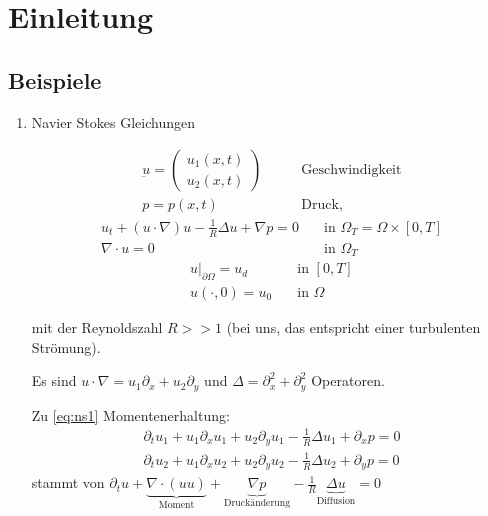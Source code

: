 
\section{Einleitung}
\label{sec:einleitung}

\subsection{Beispiele}
\label{sec:beispiele}

\begin{enumerate}
\item Navier Stokes Gleichungen

  \begin{align*}
    \underbar u =
    \begin{pmatrix}
      u_{1}(x, t)\\
      u_{2}(x, t)
    \end{pmatrix} \qquad &\text{Geschwindigkeit}\\
p = p(x, t) \qquad &\text{Druck}, 
  \end{align*}
  \begin{subequations}
\label{eq:ns}
  \begin{align}
    u_{t} + (u\cdot \nabla)u - \frac 1 R \Delta u + \nabla p = 0\quad &\text{in } \Omega_{T} = \Omega \times [0, T] \label{eq:ns1}\\
\nabla\cdot u = 0 \quad &\text{in } \Omega_{T} \label{eq:ns2}
  \end{align}
  \end{subequations}
  \begin{subequations}
\label{eq:ns}
  \begin{align}
u|_{\partial \Omega} = u_{d} \quad &\text{in } [0, T]\label{eq:ns_rb}\\
u(\cdot, 0)= u_{0} \quad &\text{in } \Omega \label{eq:ns_ab}
  \end{align}
  \end{subequations}

mit der Reynoldszahl $R >> 1$ (bei uns, das entspricht einer turbulenten Strömung). 

Es sind $u\cdot \nabla = u_{1}\partial_{x} + u_{2} \partial_{y}$ und $\Delta = \partial_{x}^{2} + \partial_{y}^{2} $ Operatoren. 

Zu \eqref{eq:ns1} Momentenerhaltung:
\begin{align*}
  \partial_{t}u_{1} + u_{1}\partial_{x}u_{1} + u_{2}\partial_{y}u_{1} -\frac 1 R \Delta u_{1} + \partial_{x} p = 0\\ 
  \partial_{t}u_{2} + u_{1}\partial_{x}u_{2} + u_{2}\partial_{y}u_{2} -\frac 1 R \Delta u_{2} + \partial_{y} p = 0
\end{align*}
stammt von $\partial_{t} u + \underbrace{\nabla\cdot(uu)}_{\text{Moment}} + \underbrace{\nabla p}_{\text{Druckänderung}}-\frac 1 R  \underbrace{\Delta u}_{\text{Diffusion}}  = 0$


\end{enumerate}

